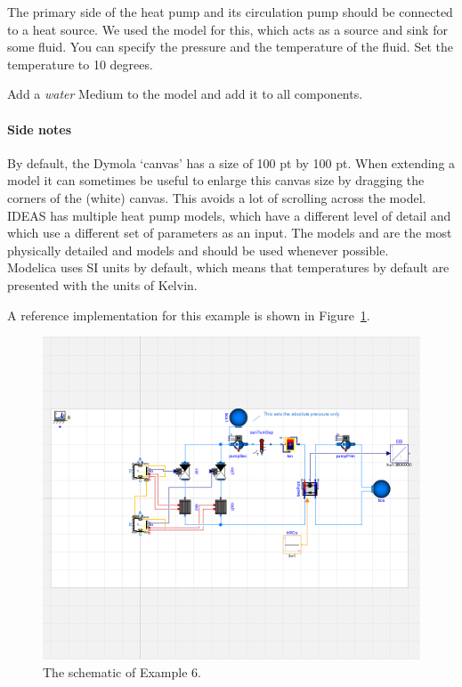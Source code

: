 \documentclass[10pt,a4paper]{article}
\begin{document}
The primary side of the heat pump and its circulation pump should be connected
to a heat source. We used the model  for this,
which acts as a source and sink for some fluid. You can specify the pressure
and the temperature of the fluid. Set the temperature to 10 degrees.

Add a \textit{water} Medium to the model and add it to all components.


\paragraph{Side notes}
By default, the Dymola `canvas' has a size of 100 pt by 100 pt. 
When extending a model  it can sometimes be useful to enlarge this canvas size by dragging
the corners of the (white) canvas. 
This avoids a lot of scrolling across the model.\\

IDEAS has multiple heat pump models, which have a different level of detail
and which use a different set of parameters as an input.
The models 
and  are
the most physically detailed and models and should be used whenever possible.\\

Modelica uses SI units by default, which means that temperatures by default 
are presented with the units of Kelvin.

A reference implementation for this example is shown in Figure~\ref{fig:sche}.

\begin{figure}
\centering
\includegraphics[width=\linewidth]{Schematic6.png}
\caption{The schematic of Example 6.}
\label{fig:sche}
\end{figure}
\end{document}

